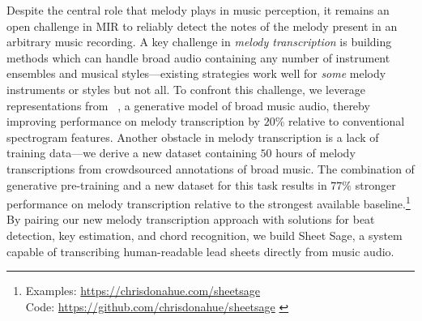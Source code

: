 Despite the central role that melody plays in music perception, 
it remains an open challenge in MIR to reliably detect the notes of the melody present in an arbitrary music recording. 
A key challenge in \emph{melody transcription} is building methods which can handle broad audio containing any number of instrument ensembles and musical styles---existing strategies work well for \emph{some} melody instruments or styles but not all. 
To confront this challenge, we leverage representations from \jukebox{}~\cite{dhariwal2020jukebox}, 
a generative model of broad music audio, 
thereby improving performance on melody transcription 
by 
$20$\% 
relative to conventional spectrogram features. 
Another obstacle in melody transcription is a lack of training data---we derive a new dataset containing $50$ hours of melody transcriptions from crowdsourced annotations of broad music. 
The combination of generative pre-training and a new dataset for this task results in 
$77\%$ stronger performance on melody transcription relative to the strongest available baseline.\footnote{Examples: \url{https://chrisdonahue.com/sheetsage} \\
Code: \url{https://github.com/chrisdonahue/sheetsage}
\label{sound_examples}} 
By pairing our new melody transcription approach with solutions for beat detection, key estimation, and chord recognition, 
we build Sheet Sage, a system capable of transcribing human-readable lead sheets directly from music audio.
